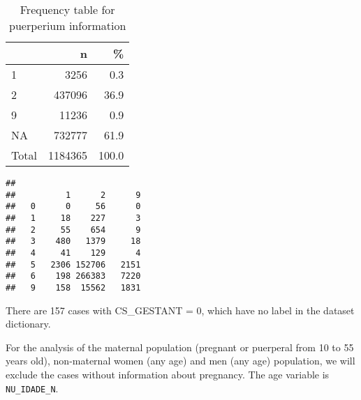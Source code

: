\documentclass[
]{article}
\newenvironment{Shaded}{\begin{snugshade}}{\end{snugshade}}
\newcommand{\KeywordTok}[1]{\textcolor[rgb]{0.13,0.29,0.53}{\textbf{#1}}}
\newcommand{\NormalTok}[1]{#1}
\newcommand{\OperatorTok}[1]{\textcolor[rgb]{0.81,0.36,0.00}{\textbf{#1}}}
\begin{document}
\begin{table}

\caption{\label{tab:unnamed-chunk-11}Frequency table for puerperium information}
\centering
\begin{tabular}[t]{l|r|r}
\hline
  & n & \%\\
\hline
1 & 3256 & 0.3\\
\hline
2 & 437096 & 36.9\\
\hline
9 & 11236 & 0.9\\
\hline
NA & 732777 & 61.9\\
\hline
Total & 1184365 & 100.0\\
\hline
\end{tabular}
\end{table}

\begin{Shaded}
\end{Shaded}

\begin{verbatim}
##    
##          1      2      9
##   0      0     56      0
##   1     18    227      3
##   2     55    654      9
##   3    480   1379     18
##   4     41    129      4
##   5   2306 152706   2151
##   6    198 266383   7220
##   9    158  15562   1831
\end{verbatim}

There are 157 cases with CS\_GESTANT = 0, which have no label in the
dataset dictionary.

For the analysis of the maternal population (pregnant or puerperal from
10 to 55 years old), non-maternal women (any age) and men (any age)
population, we will exclude the cases without information about
pregnancy. The age variable is \texttt{NU\_IDADE\_N}.
\end{document}
